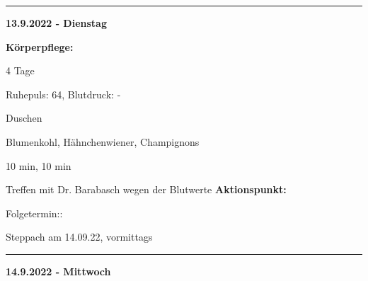 \documentclass[10pt,a4paper]{article}
\newcommand\rele[1] {{\color {english} \bf {#1}}}              %
\newcommand\opti[1] {{\color {amethyst} {\bf #1}}}             %
\newcommand\mand[1] {{\color {burntorange} {\bf #1}}}          %
\newcommand\ddivide {\vskip -9pt \hrule \vskip 6pt}
\begin{document}
\ddivide
{\rele {13.9.2022 - Dienstag}}

\begin{mdframed}[style=daystyle]
  \begin{labeling}{{\mand {Körperpflege:}}}
    \setlength\itemsep{-3pt}
  \item[{\mand {Stimmung:}}]     
  \item[{\mand {Abstinenz:}}]    4 Tage
  \item[{\mand {Gesundheit:}}]   Ruhepuls: 64, Blutdruck: -
  \item[{\mand {Körperpflege:}}] Duschen
  \item[{\mand {Essen:}}]        Blumenkohl, Hähnchenwiener, Champignons
  \item[{\mand {Zazen:}}]        10 min, 10 min
  \item[{\opti {Hausarzt:}}]     Treffen mit Dr. Barabasch wegen der Blutwerte
    \vskip -2pt        
    {\bf Aktionspunkt:}    
    \vskip -2pt
    \begin{minipage}{0.75\textwidth}  
      \begin{labeling}{Folgetermin::} 
        \setlength\itemsep{-3pt}  
      \item[Folgetermin:] Steppach am 14.09.22, vormittags
      \end{labeling}
    \end{minipage}
  \end{labeling}
\end{mdframed}

  
\ddivide
{\rele {14.9.2022 - Mittwoch}}
\end{document}
